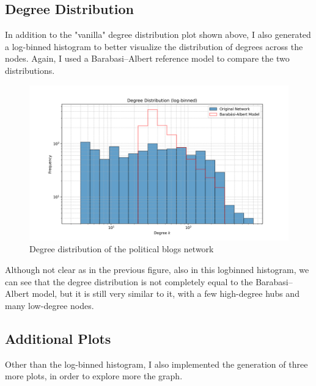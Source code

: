 \documentclass{article}
\begin{document}
\subsection{Degree Distribution}
In addition to the "vanilla" degree distribution plot shown above, I also generated a log-binned histogram to better visualize the distribution of degrees across the nodes.
Again, I used a Barabasi–Albert reference model to compare the two distributions.

\begin{figure}[H]
  \centering
  \includegraphics[width=1\textwidth]{../images/degree_distribution_logbinned.png}
  \caption{\label{fig:degree-hist}Degree distribution of the political blogs network}
\end{figure}

Although not clear as in the previous figure, also in this log\-binned histogram, we can see that the degree distribution is not completely equal to the Barabasi–Albert model, but it is still very similar to it, with a few high-degree hubs and many low-degree nodes. 

\subsection{Additional Plots}
\label{sec:additional-plots}
Other than the log-binned histogram, I also implemented the generation of three more plots, in order to explore more the graph.
\end{document}
